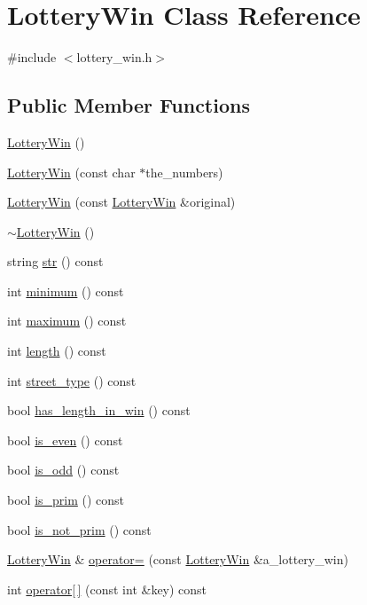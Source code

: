 \hypertarget{classLotteryWin}{\section{Lottery\-Win Class Reference}
\label{classLotteryWin}
}


{\ttfamily \#include $<$lottery\-\_\-win.\-h$>$}

\subsection*{Public Member Functions}
\begin{DoxyCompactItemize}
\item 
\hyperlink{classLotteryWin_acd0373b3ecda6dfbeda32fa0b593a9ce}{Lottery\-Win} ()
\item 
\hyperlink{classLotteryWin_a3e576f6f34eaf1cd257fe76e53f23edf}{Lottery\-Win} (const char $\ast$the\-\_\-numbers)
\item 
\hyperlink{classLotteryWin_af143f36bb7b7872373dd362ec774035c}{Lottery\-Win} (const \hyperlink{classLotteryWin}{Lottery\-Win} \&original)
\item 
\hyperlink{classLotteryWin_a283e083e29ced047b39edff5b2bf4719}{$\sim$\-Lottery\-Win} ()
\item 
string \hyperlink{classLotteryWin_a6d956ace9b19c51e5b5f112ad27eab7a}{str} () const 
\item 
int \hyperlink{classLotteryWin_a9dd8d24f837e76a4ecf430acc247799d}{minimum} () const 
\item 
int \hyperlink{classLotteryWin_a5716ca8fd1aa0cf9f20c0536023f3ead}{maximum} () const 
\item 
int \hyperlink{classLotteryWin_ac3488f97862331d15bf75594b82dc9fb}{length} () const 
\item 
int \hyperlink{classLotteryWin_a6de7cce57ced6b68468002228b9a0e8a}{street\-\_\-type} () const 
\item 
bool \hyperlink{classLotteryWin_a773a9858aaaa20c9cef0da1089a487d4}{has\-\_\-length\-\_\-in\-\_\-win} () const 
\item 
bool \hyperlink{classLotteryWin_a36045fb8a81d3e303624435499579fd0}{is\-\_\-even} () const 
\item 
bool \hyperlink{classLotteryWin_af4c2febc7e907fd72d2dd141c80826d8}{is\-\_\-odd} () const 
\item 
bool \hyperlink{classLotteryWin_a1ffa69947bd44d523288550540f77a77}{is\-\_\-prim} () const 
\item 
bool \hyperlink{classLotteryWin_aafdd1a9f1509972b86a572a22e7af403}{is\-\_\-not\-\_\-prim} () const 
\item 
\hyperlink{classLotteryWin}{Lottery\-Win} \& \hyperlink{classLotteryWin_ad98aa2f5e53d784aeee0e4170b04d15e}{operator=} (const \hyperlink{classLotteryWin}{Lottery\-Win} \&a\-\_\-lottery\-\_\-win)
\item 
int \hyperlink{classLotteryWin_a28e723a0b916844b1a5a8898e5cf92e7}{operator\mbox{[}$\,$\mbox{]}} (const int \&key) const 
\end{DoxyCompactItemize}


